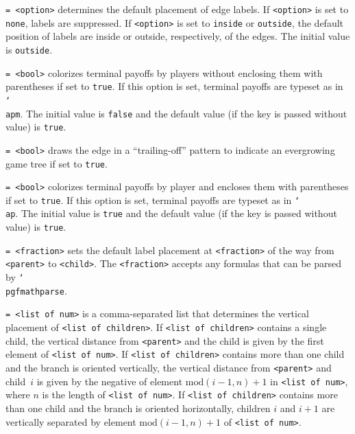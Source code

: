 \documentclass{article}
\newenvironment{desc}{\itemize[leftmargin=50pt]}{\enditemize}
\def\option#1#2{\item[\texttt{#1}] \hskip-1.5pt\texttt{#2}}
\renewcommand{\textbackslash}{\char`\\}
\def\cmd#1{\texttt{\color{cmd}\textbackslash#1}}
\begin{document}
\begin{desc}
\option{labels}{= <option>} determines the default placement of edge labels. If \texttt{<option>} is set to \texttt{none}, labels are suppressed. If \texttt{<option>} is set to \texttt{inside} or \texttt{outside}, the default position of labels are inside or outside, respectively, of the edges. The initial value is \texttt{outside}.

\option{n}{= <bool>} colorizes terminal payoffs by players without enclosing them with parentheses if set to \texttt{true}. If this option is set, terminal payoffs are typeset as in \cmd{apm}. The initial value is \texttt{false} and the default value (if the key is passed without value) is \texttt{true}. 

\option{open}{= <bool>} draws the edge in a ``trailing-off'' pattern to indicate an evergrowing game tree if set to \texttt{true}.

\option{p}{= <bool>} colorizes terminal payoffs by player and encloses them with parentheses if set to \texttt{true}. If this option is set, terminal payoffs are typeset as in \cmd{ap}. The initial value is \texttt{true} and the default value (if the key is passed without value) is \texttt{true}. 

\option{pos}{= <fraction>} sets the default label placement at \texttt{<fraction>} of the way from \texttt{<parent>} to \texttt{<child>}. The \texttt{<fraction>} accepts any formulas that can be parsed by \cmd{pgfmathparse}.

\option{v}{= <list of num>} is a comma-separated list that determines the vertical placement of \texttt{<list of children>}. If \texttt{<list of children>} contains a single child, the vertical distance from \texttt{<parent>} and the child is given by the first element of \texttt{<list of num>}. If \texttt{<list of children>} contains more than one child and the branch is oriented vertically, the vertical distance from \texttt{<parent>} and child~$i$ is given by the negative of element $\mathrm{mod}(i-1, n)+1$ in \texttt{<list of num>}, where $n$ is the length of \texttt{<list of num>}. If \texttt{<list of children>} contains more than one child and the branch is oriented horizontally, children $i$ and $i+1$ are vertically separated by element $\mathrm{mod}(i-1, n)+1$ of \texttt{<list of num>}.
\end{desc}
\end{document}
